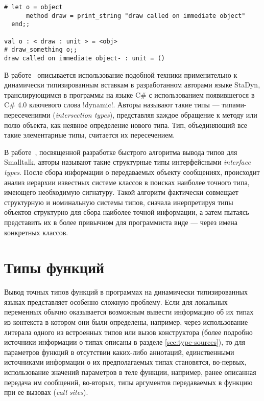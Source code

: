 \begin{lstlisting}
# let o = object
      method draw = print_string "draw called on immediate object"
  end;;

val o : < draw : unit > = <obj>
# draw_something o;;
draw called on immediate object- : unit = ()
\end{lstlisting}
\lstset{language=Python}

В работе~\cite{Ortin2011:union} описывается использование подобной техники
применительно к динамически типизированным вставкам в разработанном авторами
языке StaDyn, транслирующимся в программы на языке C\# с использованием
появившегося в C\# 4.0 ключевого слова !dynamic!.  Авторы называют такие
типы --- типами-пересечениями (\emph{intersection types}), представляя каждое
обращение к методу или полю объекта, как неявное определение нового типа. Тип,
объединяющий все такие элементарные типы, считается их пересечением.

В работе~\cite{Pluquet2009}, посвященной разработке быстрого алгоритма вывода
типов для Smalltalk, авторы называют такие структурные типы интерфейсными 
\emph{interface types}. После сбора информации о передаваемых объекту сообщениях,
происходит анализ иерархии известных системе классов в поисках наиболее
точного типа, имеющего необходимую сигнатуру. Такой алгоритм фактически
совмещает структурную и номинальную системы типов, сначала инерпретируя типы
объектов структурно для сбора наиболее точной информации, а затем пытаясь
представить их в более привычном для программиста виде --- через имена
конкретных классов.

\section{Типы функций}

Вывод точных типов функций в программах на динамически типизированных языках
представляет особенно сложную проблему. Если для локальных переменных обычно
оказывается возможным вывести информацию об их типах из контекста в котором они
были определены, например, через использование литерала одного из встроенных
типов или вызов конструктора (более подробно источники информации о типах
описаны в разделе \ref{sec:type-sources}), то для параметров функций в
отсутствии каких-либо аннотаций, единственными источниками информации о их
предполагаемых типах становятся, во-первых, использование значений параметров в
теле функции, например, ранее описанная передача им сообщений, во-вторых, типы
аргументов передаваемых в функцию при ее вызовах (\emph{call sites}).

